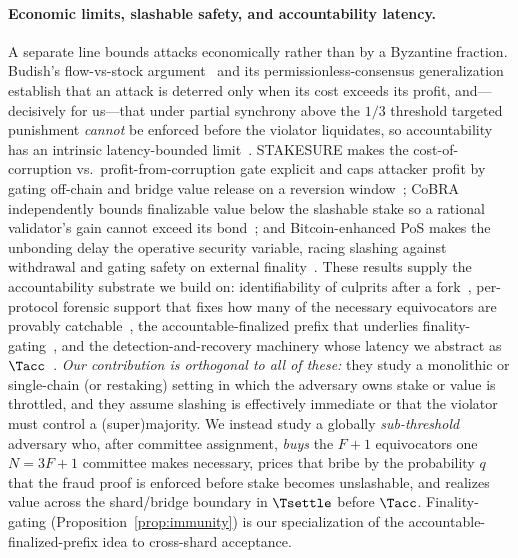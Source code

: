 
\paragraph{Economic limits, slashable safety, and accountability latency.}
A separate line bounds attacks economically rather than by a Byzantine fraction. Budish's flow-vs-stock
argument~\cite{budish2018economic} and its permissionless-consensus generalization establish that an
attack is deterred only when its cost exceeds its profit, and---decisively for us---that under partial
synchrony above the $1/3$ threshold targeted punishment \emph{cannot} be enforced before the violator
liquidates, so accountability has an intrinsic latency-bounded limit~\cite{budish2024economic}. STAKESURE
makes the cost-of-corruption vs.\ profit-from-corruption gate explicit and caps attacker profit by gating
off-chain and bridge value release on a reversion window~\cite{deb2024stakesure}; CoBRA independently
bounds finalizable value below the slashable stake so a rational validator's gain cannot exceed its
bond~\cite{avarikioti2025cobra}; and Bitcoin-enhanced PoS makes the unbonding delay the operative
security variable, racing slashing against withdrawal and gating safety on external
finality~\cite{tas2023bitcoin}. These results supply the accountability substrate we build on:
identifiability of culprits after a fork~\cite{civit2021polygraph}, per-protocol forensic support that
fixes how many of the necessary equivocators are provably catchable~\cite{sheng2021forensics}, the
accountable-finalized prefix that underlies finality-gating~\cite{neu2022accountability}, and the
detection-and-recovery machinery whose latency we abstract as $\Tacc$~\cite{gong2025recover}.
\emph{Our contribution is orthogonal to all of these:} they study a monolithic or single-chain (or
restaking) setting in which the adversary owns stake or value is throttled, and they assume slashing is
effectively immediate or that the violator must control a (super)majority. We instead study a globally
\emph{sub-threshold} adversary who, after committee assignment, \emph{buys} the $F{+}1$ equivocators one
$N{=}3F{+}1$ committee makes necessary, prices that bribe by the probability $q$ that the fraud proof is
enforced before stake becomes unslashable, and realizes value across the shard/bridge boundary in
$\Tsettle$ before $\Tacc$. Finality-gating (Proposition~\ref{prop:immunity}) is our specialization of the
accountable-finalized-prefix idea to cross-shard acceptance.

